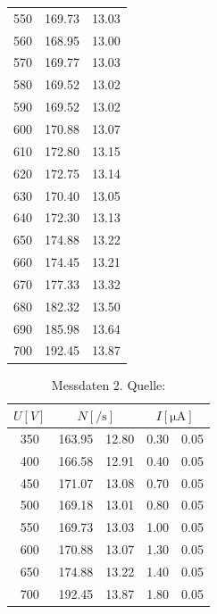 \begin{table}[H]
\begin{tabular}{c c @{${}\pm{}$} c}
          550 &  169.73 &  13.03\\
          560 &  168.95 &  13.00\\
          570 &  169.77 &  13.03\\
          580 &  169.52 &  13.02\\
          590 &  169.52 &  13.02\\
          600 &  170.88 &  13.07\\
          610 &  172.80 &  13.15\\
          620 &  172.75 &  13.14\\
          630 &  170.40 &  13.05\\
          640 &  172.30 &  13.13\\
          650 &  174.88 &  13.22\\
          660 &  174.45 &  13.21\\
          670 &  177.33 &  13.32\\
          680 &  182.32 &  13.50\\
          690 &  185.98 &  13.64\\
          700 &  192.45 &  13.87\\
          \bottomrule
        \end{tabular}
      \end{table}

\begin{table}[H]
  \centering
      \caption{Messdaten 2. Quelle:\cite{AP02}}
      \label{tab:mess2}
      \begin{tabular}{c c @{${}\pm{}$} c c @{${}\pm{}$} c}
        \toprule
        {$U [\si{V}]$} &
        \multicolumn{2}{c}{$N [\si{\per\second}]$}  &
        \multicolumn{2}{c}{$I [\si{\micro\ampere}]$}\\
        \midrule
        350 & 163.95 & 12.80 & 0.30 & 0.05\\
        400 & 166.58 & 12.91 & 0.40 & 0.05\\
        450 & 171.07 & 13.08 & 0.70 & 0.05\\
        500 & 169.18 & 13.01 & 0.80 & 0.05\\
        550 & 169.73 & 13.03 & 1.00 & 0.05\\
        600 & 170.88 & 13.07 & 1.30 & 0.05\\
        650 & 174.88 & 13.22 & 1.40 & 0.05\\
        700 & 192.45 & 13.87 & 1.80 & 0.05\\
        \bottomrule
      \end{tabular}
    \end{table}

